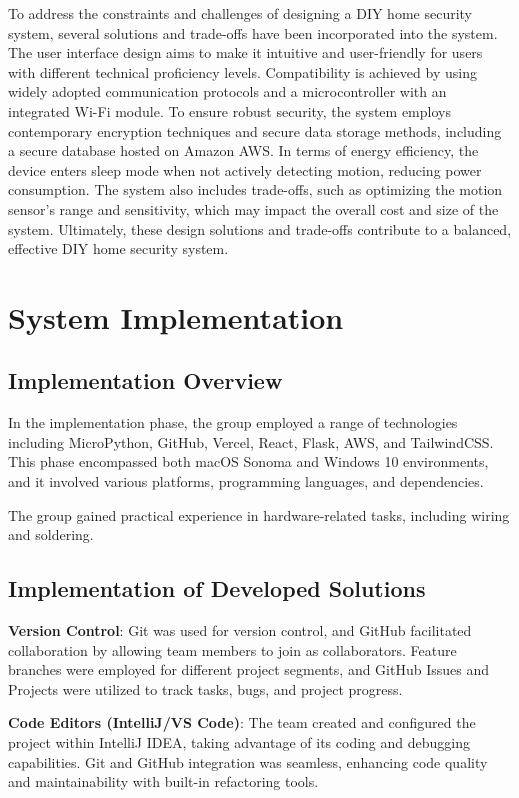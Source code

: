 \documentclass[conference]{IEEEtran}
\begin{document}
To address the constraints and challenges of designing a DIY home security system,
several solutions and trade-offs have been incorporated into the system. The user
interface design aims to make it intuitive and user-friendly for users with different
technical proficiency levels. Compatibility is achieved by using widely adopted
communication protocols and a microcontroller with an integrated Wi-Fi module.
To ensure robust security, the system employs contemporary encryption techniques
and secure data storage methods, including a secure database hosted on Amazon AWS.
In terms of energy efficiency, the device enters sleep mode when not actively
detecting motion, reducing power consumption. The system also includes trade-offs,
such as optimizing the motion sensor's range and sensitivity, which may impact the
overall cost and size of the system. Ultimately, these design solutions and
trade-offs contribute to a balanced, effective DIY home security system.

\section{System Implementation}
\subsection{Implementation Overview}
In the implementation phase, the group employed a range of technologies including MicroPython, GitHub, Vercel, React, Flask, AWS, and TailwindCSS. This phase encompassed
both macOS Sonoma and Windows 10 environments, and it involved various platforms,
programming languages, and dependencies.

The group gained practical experience in hardware-related tasks, including wiring and
soldering.

\subsection{Implementation of Developed Solutions}

\textbf{Version Control}: Git was used for version control, and GitHub facilitated
collaboration by allowing team members to join as collaborators. Feature branches
were employed for different project segments, and GitHub Issues and Projects were
utilized to track tasks, bugs, and project progress.

\textbf{Code Editors (IntelliJ/VS Code)}: The team created and configured the project
within IntelliJ IDEA, taking advantage of its coding and debugging capabilities.
Git and GitHub integration was seamless, enhancing code quality and maintainability
with built-in refactoring tools.
\end{document}
